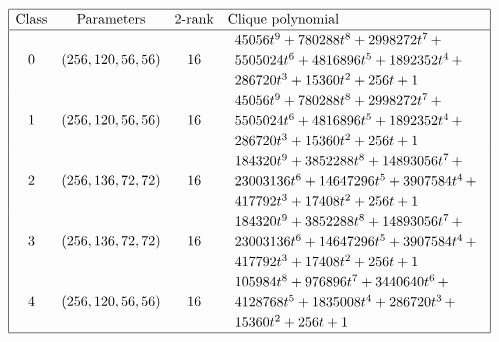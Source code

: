\documentclass[12pt,a4paper]{article}
\begin{document}
\begin{table}[!bhpt] %
\small{}
\begin{align*}
\def\arraystretch{1.2}
\begin{array}{|cccl|}
\hline
\text{Class} &
\text{Parameters} &
\text{2-rank} &
\text{Clique polynomial}
\\
\hline
0 &
(256, 120, 56, 56) &
16 &
\begin{array}{l}
45056t^{9} + 780288t^{8} + 2998272t^{7}
\,+
\\
 5505024t^{6} + 4816896t^{5} + 1892352t^{4}
\,+
\\
 286720t^{3} + 15360t^{2} + 256t + 1
\end{array}
\\
1 &
(256, 120, 56, 56) &
16 &
\begin{array}{l}
45056t^{9} + 780288t^{8} + 2998272t^{7}
\,+
\\
 5505024t^{6} + 4816896t^{5} + 1892352t^{4}
\,+
\\
 286720t^{3} + 15360t^{2} + 256t + 1
\end{array}
\\
2 &
(256, 136, 72, 72) &
16 &
\begin{array}{l}
184320t^{9} + 3852288t^{8} + 14893056t^{7}
\,+
\\
 23003136t^{6} + 14647296t^{5} + 3907584t^{4}
\,+
\\
 417792t^{3} + 17408t^{2} + 256t + 1
\end{array}
\\
3 &
(256, 136, 72, 72) &
16 &
\begin{array}{l}
184320t^{9} + 3852288t^{8} + 14893056t^{7}
\,+
\\
 23003136t^{6} + 14647296t^{5} + 3907584t^{4}
\,+
\\
 417792t^{3} + 17408t^{2} + 256t + 1
\end{array}
\\
4 &
(256, 120, 56, 56) &
16 &
\begin{array}{l}
105984t^{8} + 976896t^{7} + 3440640t^{6}
\,+
\\
 4128768t^{5} + 1835008t^{4} + 286720t^{3}
\,+
\\
 15360t^{2} + 256t + 1
\end{array}
\\
\hline
\end{array}
\end{align*}
\caption{$[f_{8,9}]$ extended Cayley classes (part 1).}
\label{tab-c8_9_EC_classes}
\end{table}
\end{document}

